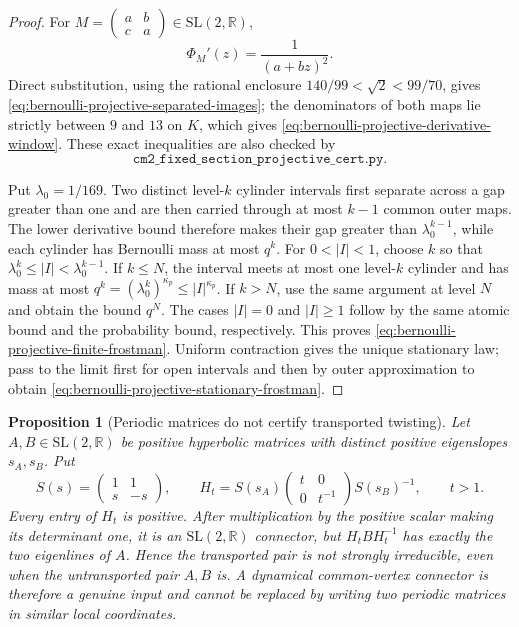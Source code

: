 \documentclass[11pt]{article}
\newtheorem{proposition}[theorem]{Proposition}
\begin{document}
\begin{proof}
For
$M=\left(\begin{smallmatrix}a&b\\c&a\end{smallmatrix}\right)
\in\mathrm{SL}(2,\mathbb R)$,
\[
 \Phi_M'(z)=\frac1{(a+bz)^2}.
\]
Direct substitution, using the rational enclosure
$140/99<\sqrt2<99/70$, gives
\eqref{eq:bernoulli-projective-separated-images}; the denominators of both
maps lie strictly between $9$ and $13$ on $K$, which gives
\eqref{eq:bernoulli-projective-derivative-window}.  These exact
inequalities are also checked by
\[
 \texttt{cm2\_fixed\_section\_projective\_cert.py}.
\]

Put $\lambda_0=1/169$.  Two distinct level-$k$ cylinder intervals first
separate across a gap greater than one and are then carried through at most
$k-1$ common outer maps.  The lower derivative bound therefore makes their
gap greater than $\lambda_0^{k-1}$, while each cylinder has Bernoulli mass
at most $q^k$.  For $0<|I|<1$, choose $k$ so that
$\lambda_0^k\le|I|<\lambda_0^{k-1}$.  If $k\le N$, the interval meets at
most one level-$k$ cylinder and has mass at most
$q^k=(\lambda_0^k)^{\kappa_p}\le|I|^{\kappa_p}$.  If $k>N$, use the same
argument at level $N$ and obtain the bound $q^N$.  The cases $|I|=0$ and
$|I|\ge1$ follow by the same atomic bound and the probability bound,
respectively.  This proves
\eqref{eq:bernoulli-projective-finite-frostman}.  Uniform contraction gives
the unique stationary law; pass to the limit first for open intervals and
then by outer approximation to obtain
\eqref{eq:bernoulli-projective-stationary-frostman}.
\end{proof}

\begin{proposition}[Periodic matrices do not certify transported twisting]
\label{prop:periodic-matrices-no-connector}
Let $A,B\in\mathrm{SL}(2,\mathbb R)$ be positive hyperbolic matrices with
distinct positive eigenslopes $s_A,s_B$.  Put
\[
 S(s)=\begin{pmatrix}1&1\\s&-s\end{pmatrix},\qquad
 H_t=S(s_A)
 \begin{pmatrix}t&0\\0&t^{-1}\end{pmatrix}S(s_B)^{-1},
 \qquad t>1.
\]
Every entry of $H_t$ is positive.  After multiplication by the positive
scalar making its determinant one, it is an
$\mathrm{SL}(2,\mathbb R)$ connector, but
$H_tBH_t^{-1}$ has exactly the two eigenlines of $A$.  Hence the
transported pair is not strongly irreducible, even when the untransported
pair $A,B$ is.  A dynamical common-vertex connector is therefore a genuine
input and cannot be replaced by writing two periodic matrices in similar
local coordinates.
\end{proposition}
\end{document}
